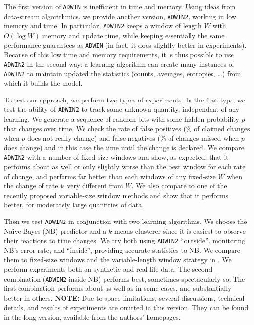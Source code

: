 The first version of {\tt ADWIN} is inefficient in time and memory.
Using ideas from data-stream algorithmics,
we provide another version, {\tt ADWIN2}, working in low memory and
time. In particular, {\tt ADWIN2} keeps a window of length $W$ with
$O(\log W)$ memory and update time, while keeping essentially
the same performance guarantees as {\tt ADWIN} (in fact, it does
slightly better in experiments).
Because of this low time and memory requirements, it is thus possible
to use {\tt ADWIN2} in the second way: a learning algorithm
can create many instances of {\tt ADWIN2} to maintain updated
the statistics (counts, averages, entropies, \dots) from which it
builds the model. 



To test our approach, we perform two types of experiments.
In the first type, we test the ability of {\tt ADWIN2}
to track some unknown quantity, independent of any learning.
We generate a sequence of random bits with some hidden
probability $p$ that changes over time. We check the rate
of false positives (\% of claimed changes when $p$ does not
really change) and false negatives (\% of changes missed
when $p$ does change) and in this case the time until
the change is declared. We compare {\tt ADWIN2} with
a number of fixed-size windows and show, as expected,
that it performs about as well or only slightly worse than the best
window for each rate of change, and performs far better than
each windows of any fixed-size $W$ when the change of rate is
very different from $W$. We also compare
to one of the recently proposed variable-size window methods \cite{Gama}
and show that it performs better, for moderately large quantities of data.

Then we test {\tt ADWIN2} in conjunction with two %
learning algorithms.
 We choose the Na\"\i ve Bayes (NB) predictor  and a $k$-means clusterer since
it is easiest to observe their reactions %
 to time changes. %
We try both using {\tt ADWIN2} ``outside'', monitoring NB's
error rate, and ``inside'', providing accurate statistics to NB.
We compare them to fixed-size windows and the 
 variable-length window strategy in \cite{Gama}.
We perform experiments both on synthetic and real-life data.
The second combination ({\tt ADWIN2} inside NB) performs best, sometimes
spectacularly so. The first combination performs about as well
as \cite{Gama} in some cases, and substantially better in others.
\ENDOMIT
\BEGINOMIT
{\bf NOTE:} Due to space limitations, several discussions,
technical details, and results of experiments are omitted in this 
version. They can be found in the long version, available from the authors'
homepages.

